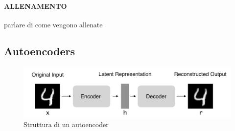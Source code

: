 \paragraph{ALLENAMENTO}

parlare di come vengono allenate

\subsection{Autoencoders}
\begin{figure}[h]
    \includegraphics[width=\hsize]{images/reti_neurali/autoencoder.png}
    \caption{Struttura di un autoencoder}
    \label{fig:autoencoder}
    \centering
\end{figure}



